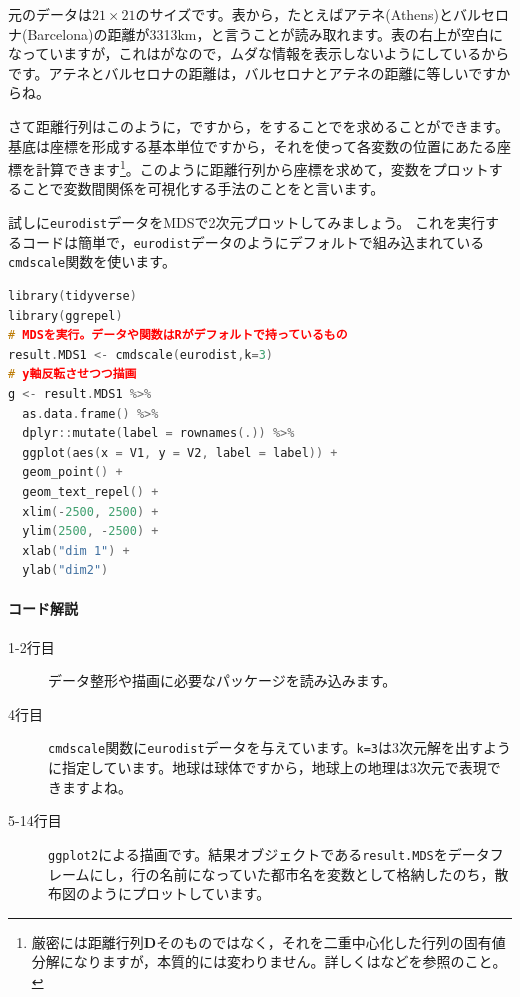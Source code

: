 \documentclass{ltjsbook}
\begin{document}
元のデータは$21 \times 21$のサイズです。表から，たとえばアテネ(Athens)とバルセロナ(Barcelona)の距離が3313km，と言うことが読み取れます。表の右上が空白になっていますが，これはがなので，ムダな情報を表示しないようにしているからです。アテネとバルセロナの距離は，バルセロナとアテネの距離に等しいですからね。

さて距離行列はこのように，ですから，をすることでを求めることができます。基底は座標を形成する基本単位ですから，それを使って各変数の位置にあたる座標を計算できます\footnote{厳密には距離行列$\bm{D}$そのものではなく，それを二重中心化した行列の固有値分解になりますが，本質的には変わりません。詳しくは\textcite{Okada19940115}などを参照のこと。}。このように距離行列から座標を求めて，変数をプロットすることで変数間関係を可視化する手法のことをと言います。

試しに\texttt{eurodist}データをMDSで2次元プロットしてみましょう。
これを実行するコードは簡単で，\texttt{eurodist}データのようにデフォルトで組み込まれている\texttt{cmdscale}関数を使います。

\begin{lstlisting}[language=C++,label={code:x15_01},caption={計量MDSの実践と描画}]
library(tidyverse)
library(ggrepel)
# MDSを実行。データや関数はRがデフォルトで持っているもの
result.MDS1 <- cmdscale(eurodist,k=3)
# y軸反転させつつ描画
g <- result.MDS1 %>%
  as.data.frame() %>%
  dplyr::mutate(label = rownames(.)) %>%
  ggplot(aes(x = V1, y = V2, label = label)) +
  geom_point() +
  geom_text_repel() +
  xlim(-2500, 2500) +
  ylim(2500, -2500) +
  xlab("dim 1") +
  ylab("dim2")
\end{lstlisting}

\paragraph{コード解説}
\begin{description}
	\item[1-2行目] データ整形や描画に必要なパッケージを読み込みます。
	\item[4行目] \verb|cmdscale|関数に\verb|eurodist|データを与えています。\verb|k=3|は3次元解を出すように指定しています。地球は球体ですから，地球上の地理は3次元で表現できますよね。
	\item[5-14行目] \verb|ggplot2|による描画です。結果オブジェクトである\verb|result.MDS|をデータフレームにし，行の名前になっていた都市名を変数として格納したのち，散布図のようにプロットしています。
\end{description}
\end{document}
